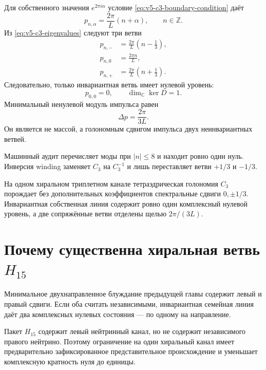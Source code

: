 Для собственного значения $e^{2\pi i\alpha}$ условие
\eqref{eq:v5-c3-boundary-condition} даёт
\begin{equation}
 p_{n,\alpha}=\frac{2\pi}{L}(n+\alpha),
 \qquad n\in\mathbb Z.
\end{equation}
Из \eqref{eq:v5-c3-eigenvalues} следуют три ветви
\begin{align}
 p_{n,-}&=\frac{2\pi}{L}\left(n-\frac13\right),\\
 p_{n,0}&=\frac{2\pi n}{L},\\
 p_{n,+}&=\frac{2\pi}{L}\left(n+\frac13\right).
 \label{eq:v5-third-shift-spectrum}
\end{align}
Следовательно, только инвариантная ветвь имеет нулевой уровень:
\begin{equation}
 p_{0,0}=0,
 \qquad
 \dim_{\mathbb C}\ker D=1.
 \label{eq:v5-one-boundary-zero}
\end{equation}
Минимальный ненулевой модуль импульса равен
\begin{equation}
 \Delta p=\frac{2\pi}{3L}.
 \label{eq:v5-holonomy-third-gap}
\end{equation}
Он является не массой, а голономным сдвигом импульса двух неинвариантных
ветвей.

Машинный аудит перечисляет моды при $|n|\le8$ и находит ровно один нуль.
Инверсия winding заменяет $C_3$ на $C_3^{-1}$ и лишь переставляет ветви
$+1/3$ и $-1/3$.

\begin{theorem}
На одном хиральном триплетном канале тетраэдрическая голономия $C_3$
порождает без дополнительных коэффициентов спектральные сдвиги
$0,\pm1/3$. Инвариантная собственная линия содержит ровно один комплексный
нулевой уровень, а две сопряжённые ветви отделены щелью
$2\pi/(3L)$.
\end{theorem}

\section{Почему существенна хиральная ветвь
\texorpdfstring{$H_{15}$}{H15}}

Минимальное двухнаправленное блуждание предыдущей главы содержит левый и
правый сдвиги. Если оба считать независимыми, инвариантная семейная линия
даёт два комплексных нулевых состояния --- по одному на направление.

Пакет $H_{15}$ содержит левый нейтринный канал, но не содержит независимого
правого нейтрино. Поэтому ограничение на один хиральный канал имеет
предварительно зафиксированное представительное происхождение и уменьшает
комплексную кратность нуля до единицы.

